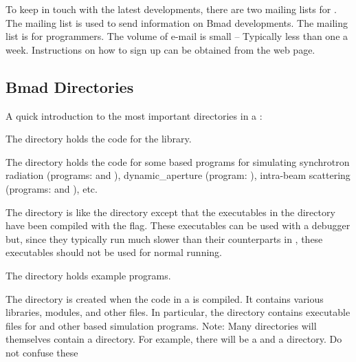 \documentclass{hitec}     %
\begin{document}
To keep in touch with the latest \bmad developments, there are two mailing lists for
\bmad.  The  mailing list is used to send information on Bmad developments.  The
 mailing list is for programmers. The volume of e-mail is small -- Typically
less than one a week. Instructions on how to sign up can be obtained from the \bmad web
page.

\subsection{Bmad Directories}
\label{s:bmad.dir}

A quick introduction to the most important directories in a :
\begin{description}
%
\vspace{-0.4 ex}
\item[bmad] \Newline
The  directory holds the code for the \bmad library.
%
\vspace{-0.4 ex}
\item[bsim] \Newline
The  directory holds the code for some \bmad based programs for simulating
synchrotron radiation (programs:  and ), dynamic_aperture (program:
), intra-beam scattering (programs:  and ), etc.
%
\vspace{-0.4 ex}
\item[debug] \Newline
The  directory is like the  directory except that the executables in the
 directory have been compiled with the  flag. These executables can be used
with a debugger but, since they typically run much slower than their counterparts in
, these executables should not be used for normal running.
%
\vspace{-0.4 ex}
\item[examples] \Newline
The  directory holds example programs.
%
\vspace{-0.4 ex}
\item[production] \Newline
The  directory is created when the code in a  is
compiled. It contains various libraries, modules, and other files. In particular, the
 directory contains executable files for \tao and other \bmad based simulation
programs. Note: Many directories will themselves contain a  directory. For example,
there will be a  and a  directory. Do not confuse these

\end{description}
\end{document}
